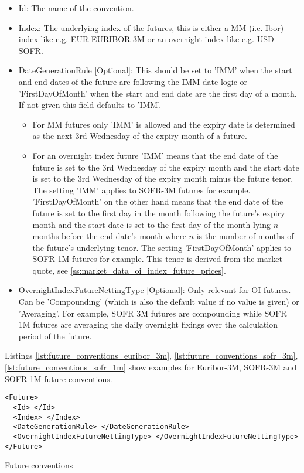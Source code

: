 \begin{itemize}
\item Id: The name of the convention.
\item Index: The underlying index of the futures, this is either a MM (i.e. Ibor) index like e.g. EUR-EURIBOR-3M or an
  overnight index like e.g. USD-SOFR.
\item DateGenerationRule [Optional]: This should be set to 'IMM' when the start and end dates of the future are
  following the IMM date logic or 'FirstDayOfMonth' when the start and end date are the first day of a month. If not
  given this field defaults to 'IMM'.
  \begin{itemize}
  \item For MM futures only 'IMM' is allowed and the expiry date is determined as the next 3rd Wednesday of the expiry
    month of a future.
  \item For an overnight index future 'IMM' means that the end date of the future is set to the 3rd Wednesday of the
    expiry month and the start date is set to the 3rd Wednesday of the expiry month minus the future tenor. The setting
    'IMM' applies to SOFR-3M futures for example. 'FirstDayOfMonth' on the other hand means that the end date of the
    future is set to the first day in the month following the future's expiry month and the start date is set to the
    first day of the month lying $n$ months before the end date's month where $n$ is the number of months of the
    future's underlying tenor. The setting 'FirstDayOfMonth' applies to SOFR-1M futures for example. This tenor is
    derived from the market quote, see \ref{ss:market_data_oi_index_future_prices}.
  \end{itemize}
\item OvernightIndexFutureNettingType [Optional]: Only relevant for OI futures. Can be 'Compounding' (which is also the
  default value if no value is given) or 'Averaging'. For example, SOFR 3M futures are compounding while SOFR 1M futures
  are averaging the daily overnight fixings over the calculation period of the future.
\end{itemize}

Listings \ref{lst:future_conventions_euribor_3m}, \ref{lst:future_conventions_sofr_3m},
\ref{lst:future_conventions_sofr_1m} show examples for Euribor-3M, SOFR-3M and SOFR-1M future conventions.

\begin{listing}[H]
\begin{verbatim}
<Future>
  <Id> </Id>
  <Index> </Index>
  <DateGenerationRule> </DateGenerationRule>
  <OvernightIndexFutureNettingType> </OvernightIndexFutureNettingType>
</Future>
\end{verbatim}
\caption{Future conventions}
\label{lst:future_conventions}
\end{listing}

